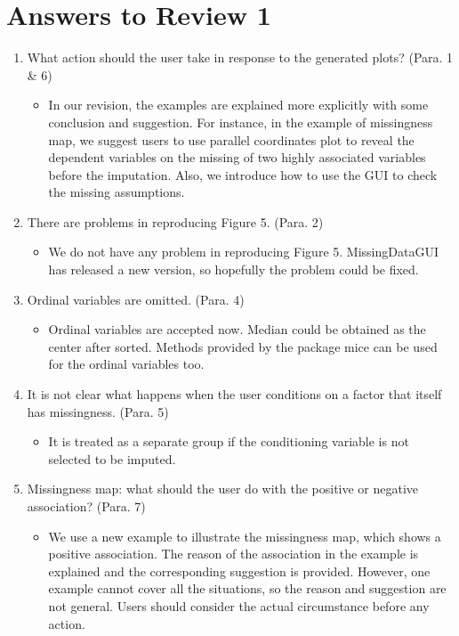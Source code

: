 \documentclass[12pt,english]{article}
\begin{document}
\section*{Answers to Review 1}
\begin{enumerate}

\item What action should the user take in response to the generated plots?
(Para. 1 \& 6)
\begin{itemize}
\item In our revision, the examples are explained more explicitly with some
conclusion and suggestion. For instance, in the example of missingness
map, we suggest users to use parallel coordinates plot to reveal the
dependent variables on the missing of two highly associated variables
before the imputation. Also, we introduce how to use the GUI to check
the missing assumptions.
\end{itemize}

\item There are problems in reproducing Figure 5. (Para. 2)
\begin{itemize}
\item We do not have any problem in reproducing Figure 5. MissingDataGUI
has released a new version, so hopefully the problem could be fixed.
\end{itemize}

\item Ordinal variables are omitted. (Para. 4)
\begin{itemize}
\item Ordinal variables are accepted now. Median could be obtained as the
center after sorted. Methods provided by the package mice can be used
for the ordinal variables too.
\end{itemize}

\item It is not clear what happens when the user conditions on a factor
that itself has missingness. (Para. 5)
\begin{itemize}
\item It is treated as a separate group if the conditioning variable is
not selected to be imputed.
\end{itemize}

\item Missingness map: what should the user do with the positive or negative
association? (Para. 7)
\begin{itemize}
\item We use a new example to illustrate the missingness map, which shows
a positive association. The reason of the association in the example
is explained and the corresponding suggestion is provided. However,
one example cannot cover all the situations, so the reason and suggestion
are not general. Users should consider the actual circumstance before
any action.
\end{itemize}


\end{enumerate}
\end{document}
